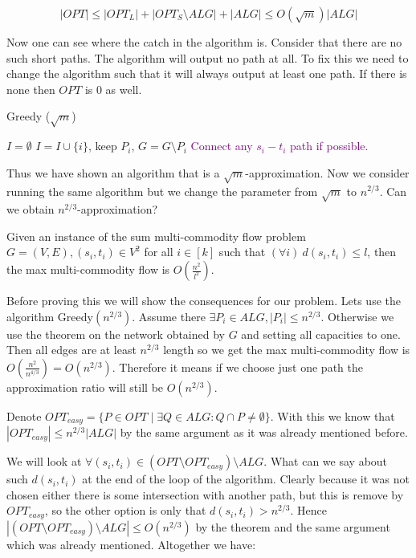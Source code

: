$$
|OPT| \leq |OPT_{L}| + |OPT_{S} \setminus ALG| + |ALG| \leq O(\sqrt{m}) |ALG|
$$

Now one can see where the catch in the algorithm is. Consider that there are no such short paths. The algorithm will output no path at all. To fix this we need to change the algorithm such that it will always output at least one path. If there is none then $OPT$ is 0 as well.

\begin{algorithm}
	\caption{Greedy ($\sqrt{m}$)}
	\begin{algorithmic}[1]
		\State $I = \emptyset$
		\State $I = I \cup \{i\}$, keep $P_{i}$, $G = G \setminus P_{i}$
		\EndWhile
		\If{\textcolor{purple}{$I = \emptyset$}}
			\State \textcolor{purple}{Connect any $s_{i}-t_{i}$ path if possible.}
		\EndIf
	\end{algorithmic}
\end{algorithm}

Thus we have shown an algorithm that is a $\sqrt{m}$-approximation. Now we consider running the same algorithm but we change the parameter from $\sqrt{m}$ to $n^{2/3}$. Can we obtain $n^{2/3}$-approximation?

\begin{thm}
	\label{max flow bounded}
	Given an instance of the sum multi-commodity flow problem $G =(V,E), (s_{i}, t_{i}) \in V^2$ for all $i \in [k]$ such that $(\forall i) \ d(s_{i}, t_{i}) \leq l$, then the max multi-commodity flow is $O(\frac{n^2}{l^2})$.
\end{thm}

Before proving this we will show the consequences for our problem. Lets use the algorithm Greedy$(n^{2/3})$. Assume there $\exists P_{i} \in ALG, |P_{i}| \leq n^{2/3}$. Otherwise we use the theorem on the network obtained by $G$ and setting all capacities to one. Then all edges are at least $n^{2/3}$ length so we get the max multi-commodity flow is $O(\frac{n^{2}}{n^{4/3}}) = O(n^{2/3})$. Therefore it means if we choose just one path the approximation ratio will still be $O(n^{2/3})$.

Denote $OPT_{easy} = \{P \in OPT \mid \exists Q \in ALG : Q \cap P \neq \emptyset\}$. With this we know that $|OPT_{easy}| \leq n^{2/3} |ALG|$ by the same argument as it was already mentioned before.

We will look at $\forall (s_{i}, t_{i}) \in (OPT \setminus OPT_{easy}) \setminus ALG$. What can we say about such $d(s_{i}, t_{i})$ at the end of the loop of the algorithm. Clearly because it was not chosen either there is some intersection with another path, but this is remove by $OPT_{easy}$, so the other option is only that $d(s_{i}, t_{i}) > n^{2/3}$. Hence $|(OPT \setminus OPT_{easy}) \setminus ALG| \leq O(n^{2/3})$ by the theorem and the same argument which was already mentioned. Altogether we have:

